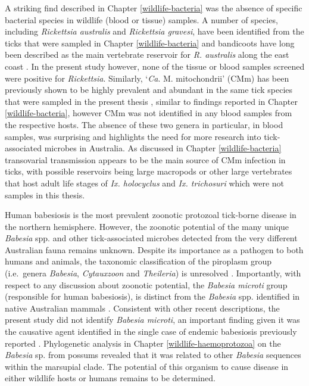 \documentclass[a4paper, nobind]{templates/ociamthesis}
\begin{document}
A striking find described in Chapter \ref{wildlife-bacteria} was the absence of specific bacterial species in wildlife (blood or tissue) samples.
A number of species, including \emph{Rickettsia australis} and \emph{Rickettsia gravesi}, have been identified from the ticks that were sampled in Chapter \ref{wildlife-bacteria} and bandicoots have long been described as the main vertebrate reservoir for \emph{R. australis} along the east coast \autocite{campbellRickettsiosesAustraliaIsolation1974,sextonSpottedFeverGroup1991}.
In the present study however, none of the tissue or blood samples screened were positive for \emph{Rickettsia}.
Similarly, `\emph{Ca}. M. mitochondrii' (CMm) has been previously shown to be highly prevalent and abundant in the same tick species that were sampled in the present thesis \autocite{goftonInhibitionEndosymbiontCandidatus2015,eganBacterialCommunityProfiling2020}, similar to findings reported in Chapter \ref{wildlife-bacteria}, however CMm was not identified in any blood samples from the respective hosts.
The absence of these two genera in particular, in blood samples, was surprising and highlights the need for more research into tick-associated microbes in Australia.
As discussed in Chapter \ref{wildlife-bacteria} transovarial transmission appears to be the main source of CMm infection in ticks, with possible reservoirs being large macropods or other large vertebrates that host adult life stages of \emph{Ix. holocyclus} and \emph{Ix. trichosuri} which were not samples in this thesis.

Human babesiosis is the most prevalent zoonotic protozoal tick-borne disease in the northern hemisphere.
However, the zoonotic potential of the many unique \emph{Babesia} spp. and other tick-associated microbes detected from the very different Australian fauna remains unknown.
Despite its importance as a pathogen to both humans and animals, the taxonomic classification of the piroplasm group (i.e.~genera \emph{Babesia}, \emph{Cytauxzoon} and \emph{Theileria}) is unresolved \autocite{papariniFirstMolecularCharacterization2015,schreegMitochondrialGenomeSequences2016,barbosaSequenceAnalysesMitochondrial2019}.
Importantly, with respect to any discussion about zoonotic potential, the \emph{Babesia microti} group (responsible for human babesiosis), is distinct from the \emph{Babesia} spp. identified in native Australian mammals \autocite{schreegMitochondrialGenomeSequences2016,barbosaSequenceAnalysesMitochondrial2019}.
Consistent with other recent descriptions, the present study did not identify \emph{Babesia microti}, an important finding given it was the causative agent identified in the single case of endemic babesiosis previously reported \autocite{senanayakeFirstReportHuman2012}.
Phylogenetic analysis in Chapter \ref{wildlife-haemoprotozoa} on the \emph{Babesia} sp. from possums revealed that it was related to other \emph{Babesia} sequences within the marsupial clade.
The potential of this organism to cause disease in either wildlife hosts or humans remains to be determined.
\end{document}
